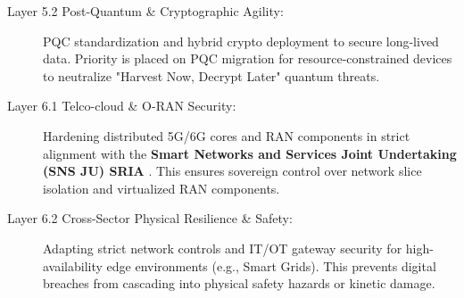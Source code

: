 \documentclass[12pt,a4paper]{article}
\begin{document}
\begin{description}
\item[Layer 5.2 Post-Quantum \& Cryptographic Agility:] PQC standardization and hybrid crypto deployment to secure long-lived data. Priority is placed on PQC migration for resource-constrained devices to neutralize "Harvest Now, Decrypt Later" quantum threats.

\item[Layer 6.1 Telco-cloud \& O-RAN Security:] Hardening distributed 5G/6G cores and RAN components in strict alignment with the \textbf{Smart Networks and Services Joint Undertaking (SNS JU) SRIA} \cite{snsju}. This ensures sovereign control over network slice isolation and virtualized RAN components.

\item[Layer 6.2 Cross-Sector Physical Resilience \& Safety:] Adapting strict network controls and IT/OT gateway security for high-availability edge environments (e.g., Smart Grids). This prevents digital breaches from cascading into physical safety hazards or kinetic damage.

\end{description}
\end{document}
